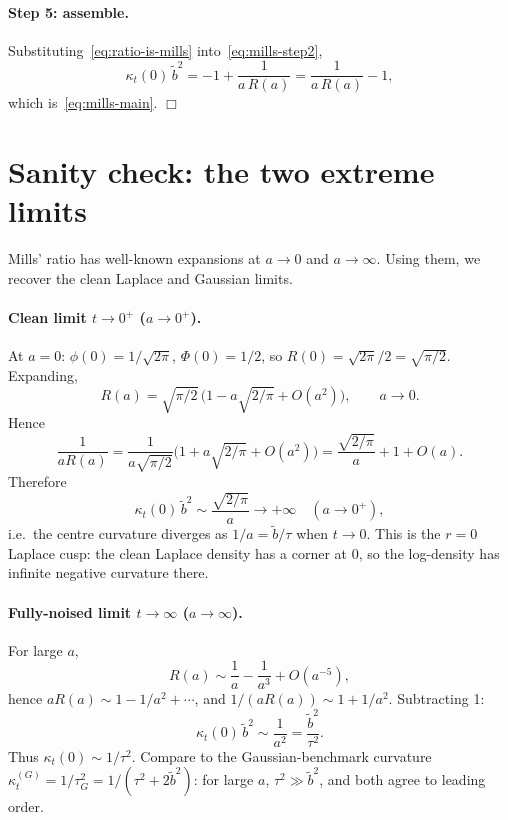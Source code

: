 \documentclass[11pt,a4paper,openany]{book}
\theoremstyle{plainserif}
\theoremstyle{definition}
\theoremstyle{remarkstyle}
\newcommand{\btilde}{\tilde{b}}
\newcommand{\mills}{R}
\begin{document}
\paragraph{Step 5: assemble.}
Substituting~\eqref{eq:ratio-is-mills} into~\eqref{eq:mills-step2},
\begin{equation}
\kappa_t(0)\,\btilde^2 = -1 + \frac{1}{a\,\mills(a)}
                       = \frac{1}{a\,\mills(a)} - 1,
\end{equation}
which is~\eqref{eq:mills-main}. $\Box$

\section{Sanity check: the two extreme limits}

Mills' ratio has well-known expansions at $a\to 0$ and $a\to\infty$.
Using them, we recover the clean Laplace and Gaussian limits.

\paragraph{Clean limit $t\to 0^+$ ($a\to 0^+$).}
At $a = 0$: $\phi(0) = 1/\sqrt{2\pi}$, $\Phi(0) = 1/2$, so
$\mills(0) = \sqrt{2\pi}/2 = \sqrt{\pi/2}$.
Expanding,
\begin{equation}
\mills(a) = \sqrt{\pi/2}\,\bigl(1 - a\sqrt{2/\pi} + O(a^2)\bigr),\qquad a\to 0.
\label{eq:mills-small}
\end{equation}
Hence
\begin{equation}
\frac{1}{a\mills(a)} = \frac{1}{a\sqrt{\pi/2}}\bigl(1 + a\sqrt{2/\pi} + O(a^2)\bigr)
 = \frac{\sqrt{2/\pi}}{a} + 1 + O(a).
\end{equation}
Therefore
\begin{equation}
\kappa_t(0)\,\btilde^2 \sim \frac{\sqrt{2/\pi}}{a} \to +\infty \quad (a\to 0^+),
\label{eq:kappa-small-t}
\end{equation}
i.e.\ the centre curvature diverges as $1/a = \btilde/\tau$ when $t\to 0$.
This is the $r=0$ Laplace cusp: the clean Laplace density has a corner
at $0$, so the log-density has infinite negative curvature there.

\paragraph{Fully-noised limit $t\to\infty$ ($a\to\infty$).}
For large $a$,
\begin{equation}
\mills(a) \sim \frac{1}{a} - \frac{1}{a^3} + O(a^{-5}),
\label{eq:mills-large}
\end{equation}
hence $a\mills(a) \sim 1 - 1/a^2 + \cdots$, and
$1/(a\mills(a)) \sim 1 + 1/a^2$. Subtracting 1:
\begin{equation}
\kappa_t(0)\,\btilde^2 \sim \frac{1}{a^2} = \frac{\btilde^2}{\tau^2}.
\end{equation}
Thus $\kappa_t(0) \sim 1/\tau^2$. Compare to the Gaussian-benchmark
curvature $\kappa_t^{(G)} = 1/\tau_G^2 = 1/(\tau^2 + 2\btilde^2)$: for
large $a$, $\tau^2 \gg \btilde^2$, and both agree to leading order.
\end{document}
